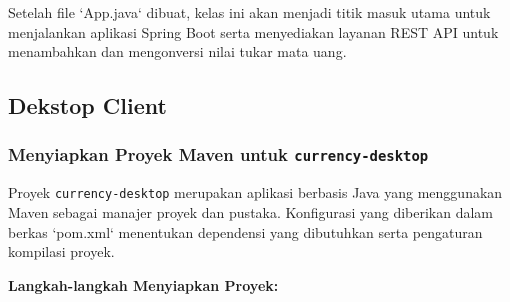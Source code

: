 Setelah file `App.java` dibuat, kelas ini akan menjadi titik masuk utama untuk menjalankan aplikasi Spring Boot serta menyediakan layanan REST API untuk menambahkan dan mengonversi nilai tukar mata uang.

\subsection{Dekstop Client}

\subsubsection{Menyiapkan Proyek Maven untuk \texttt{currency-desktop}}
Proyek \texttt{currency-desktop} merupakan aplikasi berbasis Java yang menggunakan Maven sebagai manajer proyek dan pustaka. Konfigurasi yang diberikan dalam berkas `pom.xml` menentukan dependensi yang dibutuhkan serta pengaturan kompilasi proyek.

\textbf{Langkah-langkah Menyiapkan Proyek:}

